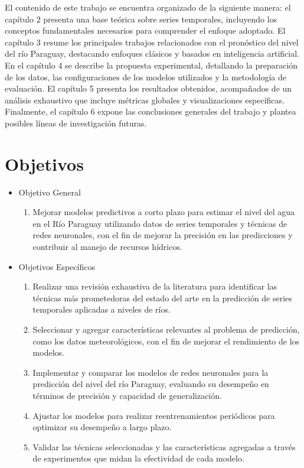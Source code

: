 El contenido de este trabajo se encuentra organizado de la siguiente manera: el capítulo 2 presenta una base teórica sobre series temporales, incluyendo los conceptos fundamentales necesarios para comprender el enfoque adoptado. El capítulo 3 resume los principales trabajos relacionados con el pronóstico del nivel del río Paraguay, destacando enfoques clásicos y basados en inteligencia artificial. En el capítulo 4 se describe la propuesta experimental, detallando la preparación de los datos, las configuraciones de los modelos utilizados y la metodología de evaluación. El capítulo 5 presenta los resultados obtenidos, acompañados de un análisis exhaustivo que incluye métricas globales y visualizaciones específicas. Finalmente, el capítulo 6 expone las conclusiones generales del trabajo y plantea posibles líneas de investigación futuras.







\section{Objetivos}
\begin{itemize}
    \item Objetivo General
    \begin{enumerate}
        \item Mejorar modelos predictivos a corto plazo para estimar el nivel del agua en el Río Paraguay utilizando datos de series temporales y técnicas de redes neuronales, con el fin de mejorar la precisión en las predicciones y contribuir al manejo de recursos hídricos.
    \end{enumerate}
    \item Objetivos Específicos
    \begin{enumerate}
        \item Realizar una revisión exhaustiva de la literatura para identificar las técnicas más prometedoras del estado del arte en la predicción de series temporales aplicadas a niveles de ríos.
        \item Seleccionar y agregar características relevantes al problema de predicción, como los datos meteorológicos, con el fin de mejorar el rendimiento de los modelos.
        \item Implementar y comparar los modelos de redes neuronales para la predicción del nivel del río Paraguay, evaluando su desempeño en términos de precisión y capacidad de generalización.
        \item Ajustar los modelos para realizar reentrenamientos periódicos para optimizar su desempeño a largo plazo.
        \item Validar las técnicas seleccionadas y las características agregadas a través de experimentos que midan la efectividad de cada modelo. 
    \end{enumerate}
\end{itemize}
